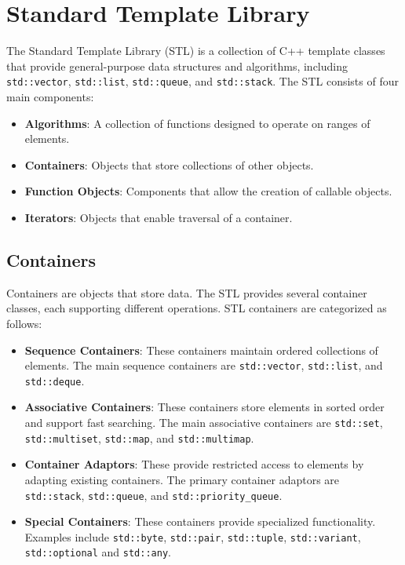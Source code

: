 
\chapter{Standard Template Library}\label{ch:stl}

The Standard Template Library (STL) is a collection of C++ template classes that provide general-purpose data structures and algorithms, including \texttt{std::vector}, \texttt{std::list}, \texttt{std::queue}, and \texttt{std::stack}. The STL consists of four main components:

\begin{itemize}
    \item \textbf{Algorithms}: A collection of functions designed to operate on ranges of elements.
    \item \textbf{Containers}: Objects that store collections of other objects.
    \item \textbf{Function Objects}: Components that allow the creation of callable objects.
    \item \textbf{Iterators}: Objects that enable traversal of a container.
\end{itemize}

\section{Containers}

Containers are objects that store data. The STL provides several container classes, each supporting different operations. STL containers are categorized as follows:

\begin{itemize}
    \item \textbf{Sequence Containers}: These containers maintain ordered collections of elements. The main sequence containers are \texttt{std::vector}, \texttt{std::list}, and \texttt{std::deque}.
    \item \textbf{Associative Containers}: These containers store elements in sorted order and support fast searching. The main associative containers are \texttt{std::set}, \texttt{std::multiset}, \texttt{std::map}, and \texttt{std::multimap}.
    \item \textbf{Container Adaptors}: These provide restricted access to elements by adapting existing containers. The primary container adaptors are \texttt{std::stack}, \texttt{std::queue}, and \texttt{std::priority\_queue}.
    \item \textbf{Special Containers}: These containers provide specialized functionality. Examples include \texttt{std::byte}, \texttt{std::pair}, \texttt{std::tuple}, \texttt{std::variant}, \texttt{std::optional} and \texttt{std::any}.
\end{itemize}

